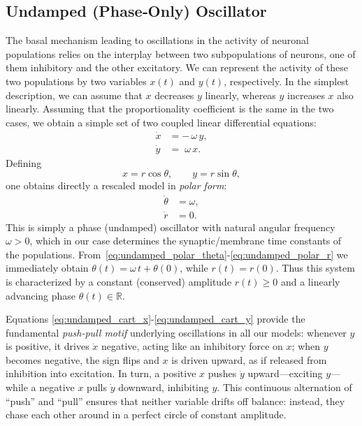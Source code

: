 \documentclass[11pt]{article}
\numberwithin{equation}{section}
\newcommand{\rev}[1]{\begingroup\color{black}#1\endgroup}
\begin{document}
\subsection{Undamped (Phase‐Only) Oscillator}

The basal mechanism leading to oscillations in the activity of neuronal populations relies on the interplay between two subpopulations of neurons, one of them inhibitory and the other excitatory.
We can represent the activity of these two populations by two variables $x(t)$ and $y(t)$, respectively.
In the simplest description, we can assume that $x$ decreases $y$ linearly, whereas $y$ increases $x$ also linearly.
Assuming that the proportionality coefficient is the same in the two cases, we obtain a simple set of two coupled linear differential equations:
\begin{align}
    \dot{x} &= -\,\omega\,y,
    \label{eq:undamped_cart_x}\\
    \dot{y} &= \;\omega\,x.
    \label{eq:undamped_cart_y}
\end{align}
Defining
\begin{equation}
    x = r \cos\theta,\qquad
    y = r \sin\theta,
    \label{eq:undamped_xy_def}
\end{equation}
one obtains directly a rescaled model in \textit{polar form}:
\begin{align}
    \dot{\theta} &= \omega, 
    \label{eq:undamped_polar_theta}\\
    \dot{r}      &= 0.
    \label{eq:undamped_polar_r}
\end{align}
This is simply a phase (undamped) oscillator with natural angular frequency $\omega>0$, which in our case determines the synaptic/membrane time constants of the populations.
From~\eqref{eq:undamped_polar_theta}-\eqref{eq:undamped_polar_r} we immediately obtain $\theta(t) = \omega\,t + \theta(0)$, while $r(t) = r(0)$. Thus this \rev{system} is characterized by a constant \rev{(conserved)} amplitude $r(t)\ge0$ and a linearly advancing phase
$\theta(t)\in\mathbb{R}$.  

  Equations \eqref{eq:undamped_cart_x}-\eqref{eq:undamped_cart_y} provide the fundamental \textit{push-pull motif} underlying oscillations in all our models: whenever \(y\) is positive, it drives \(\dot{x}\) negative, acting like an inhibitory force on \(x\); when \(y\) becomes negative, the sign flips and \(x\) is driven upward, as if released from inhibition into excitation.  In turn, a positive \(x\) pushes \(\dot{y}\) upward—exciting \(y\)—while a negative \(x\) pulls \(\dot{y}\) downward, inhibiting \(y\).  This continuous alternation of “push” and “pull” ensures that neither variable drifts off balance: instead, they chase each other around in a perfect circle of constant amplitude.
\end{document}
